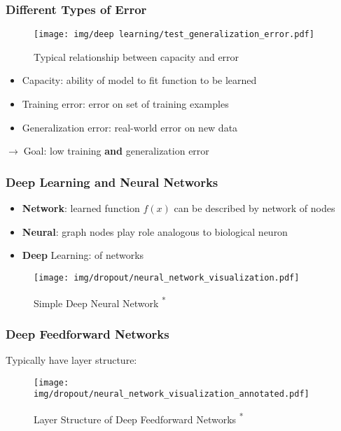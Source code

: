 \documentclass{beamer}
\newcommand{\arrow}{$\rightarrow\;$}
\begin{document}
\begin{frame}
    \frametitle{Different Types of Error}
    \begin{figure}[H]
        \texttt{[image: img/deep learning/test\_generalization\_error.pdf]}
        \caption{Typical relationship between capacity and error \cite{textbook}}
    \end{figure}
    
    \begin{itemize}
        \item Capacity: ability of model to fit function to be learned
        \item Training error: error on set of training examples
        \item Generalization error: real-world error on new data
    \end{itemize}
    \arrow Goal: low training \textbf{and} generalization error
\end{frame}

\begin{frame}
    \frametitle{Deep Learning and Neural Networks}
    \begin{itemize}
        \item \textbf{Network}: learned function $f(x)$ can be described by network of nodes
        \item \textbf{Neural}: graph nodes play role analogous to biological neuron
        \item \textbf{Deep} Learning:  of networks
    \end{itemize}

    \begin{figure}
        \texttt{[image: img/dropout/neural\_network\_visualization.pdf]}
        \caption{Simple Deep Neural Network \cite{dropout}\textsuperscript{*}}
    \end{figure}
\end{frame}

\begin{frame}
    \frametitle{Deep Feedforward Networks}
    Typically have layer structure:
    \begin{figure}
        \texttt{[image: img/dropout/neural\_network\_visualization\_annotated.pdf]}
        \caption{Layer Structure of Deep Feedforward Networks \cite{dropout}\textsuperscript{*}}
    \end{figure}
\end{frame}
\end{document}
